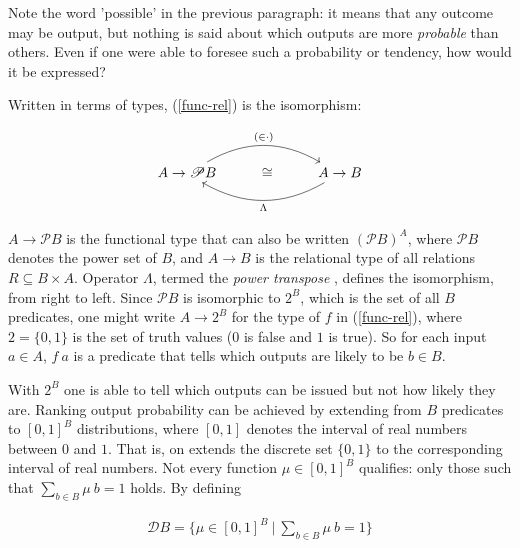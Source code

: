 \documentclass[
  oneside,
  11pt, a4paper,
  footinclude=true,
  headinclude=true,
  cleardoublepage=empty
]{scrbook}
\theoremstyle{definition}
\theoremstyle{definition}
\begin{document}
    Note the word 'possible' in the previous paragraph: it means that any outcome may be output, but nothing is said about which outputs are more \emph{probable} than others. Even if one were able to foresee such a probability or tendency, how would it be expressed?
    
    Written in terms of types, (\ref{func-rel}) is the isomorphism:
    
    \begin{equation}\label{func-rel-2}
    \begin{tikzcd}
    A \rightarrow \mathscr{P} B \arrow[rr, "(\in \cdot)", bend left] & \cong & A \rightarrow B \arrow[ll, "\Lambda", bend left]
    \end{tikzcd}
    \end{equation}
    
    \noindent $A \rightarrow \mathscr{P}B$ is the functional type that can also be written $(\mathscr{P}B)^{A}$, where $\mathscr{P}B$ denotes the power set of $B$, and $A \rightarrow B$ is the relational type of all relations $R \subseteq B \times A$. Operator $\Lambda$, termed the \emph{ power transpose} \citep{Bird:1997:AP:248932,oliveira2012towards, freyd1990categories}, defines the isomorphism, from right to left. Since $\mathscr{P}B$ is isomorphic to $2^{B}$, which is the set of all $B$ predicates, one might write $A \rightarrow 2^{B}$ for the type of $f$ in (\ref{func-rel}), where $2 = \{0,1\}$ is the set of truth values ($0$ is false and $1$ is true). So for each input $a \in A$, $f\ a$ is a predicate that tells which outputs are likely to be $b \in B$.
    
    With $2^B$ one is able to tell which outputs can be issued but not how likely they are. Ranking output probability can be achieved by extending from $B$ predicates to $[0,1]^{B}$ distributions, where $[0,1]$ denotes the interval of real numbers between $0$ and $1$. That is, on extends the discrete set $\{0,1\}$ to the corresponding interval of real numbers. Not every function $\mu \in [0,1]^{B}$ qualifies: only those such that $\sum\limits_{b \in B} \mu\ b = 1$ holds. By defining
    
        \begin{align}\label{func-rel-3}
            \mathscr{D}B = \{\mu \in [0,1]^{B}\ |\ \sum\limits_{b \in B} \mu\ b = 1 \}
        \end{align}
        
\end{document}
